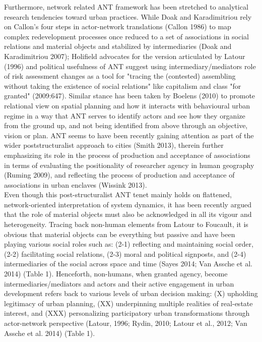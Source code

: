\documentclass[11pt]{report}
\begin{document}
Furthermore, network related ANT framework has been stretched to analytical research tendencies toward urban practices. While Doak and Karadimitriou rely on Callon’s four steps in actor-network translations  (Callon 1986) to map complex redevelopment processes once reduced to a set of associations in social relations and material objects and stabilized by intermediaries (Doak and Karadimitriou 2007); Holifield  advocates for the version articulated by Latour (1996) and political usefulness of ANT suggest using  intermediary/mediators role of risk assessment changes as a tool for "tracing the (contested) assembling without taking the existence of social relations" like capitalism and class "for granted" (2009:647). Similar stance has been taken by Boelens (2010) to promote relational view on spatial planning and how it interacts with behavioural urban regime in a way that ANT serves to identify actors and see how they organize from the ground up, and not being identified from above through an objective, vision or plan. ANT seems to have been recently gaining attention as part of the wider poststructuralist approach to cities  (Smith 2013), therein further emphasizing its role in the process of production and acceptance of associations in terms of evaluating the positionality of researcher agency in human geography (Ruming 2009), and  reflecting the process of production and acceptance of associations in urban enclaves (Wissink 2013).
\\
Even though this post-structuralist ANT tenet mainly holds on flattened, network-oriented interpretation of system dynamics, it has been recently argued that the role of material objects must also be acknowledged in all its vigour and heterogeneity. Tracing back non-human elements from Latour to Foucault, it is obvious that material objects can be everything but passive and have been playing various social roles such as: (2-1) reflecting and maintaining social order, (2-2) facilitating social relations, (2-3) moral and political signposts, and (2-4) intermediaries of the social across space and time (Sayes 2014; Van Assche et al. 2014) (Table 1). Henceforth, non-humans, when granted agency, become intermediaries/mediators and actors and their active engagement in urban development refers back to various levels of urban decision making: (X) upholding legitimacy of urban planning, (XX) underpinning multiple realities of real-estate interest, and (XXX) personalizing participatory urban transformations through actor-network perspective (Latour, 1996; Rydin, 2010; Latour et al., 2012; Van Assche et al. 2014) (Table 1).
\end{document}

